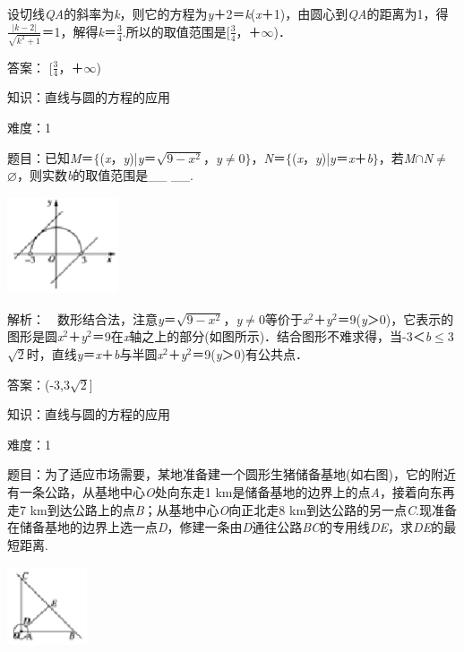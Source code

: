 \documentclass{article} %
\begin{document}
设切线\textit{QA}的斜率为\textit{k}，则它的方程为\textit{y}＋2＝\textit{k}(\textit{x}＋1)，由圆心到\textit{QA}的距离为1，得$\frac{|k-2|}{\sqrt{k^2+1}}$＝1，解得\textit{k}＝$\frac{3}{4}$.所以的取值范围是[$\frac{3}{4}$，＋$\mathrm{\infty}$)．

答案： [$\frac{3}{4}$，＋$\mathrm{\infty}$)

知识：直线与圆的方程的应用

难度：1

题目：已知\textit{M}＝$\mathrm{\{}$(\textit{x}，\textit{y})|\textit{y}＝$\sqrt{9-x^2}$，\textit{y}$\mathrm{\neq}$0$\mathrm{\}}$，\textit{N}＝$\mathrm{\{}$(\textit{x}，\textit{y})|\textit{y}＝\textit{x}＋\textit{b}$\mathrm{\}}$，若\textit{M}$\mathrm{\cap}$\textit{N}$\mathrm{\neq}$$\mathrm{\varnothing}$，则实数\textit{b}的取值范围是\_\_ \_\_.

\includegraphics*[width=1.29in, height=1.13in, keepaspectratio=false]{image301}

解析：　数形结合法，注意\textit{y}＝$\sqrt{9-x^2}$，\textit{y}$\mathrm{\neq}$0等价于\textit{x}${}^{2}$＋\textit{y}${}^{2}$＝9(\textit{y}＞0)，它表示的图形是圆\textit{x}${}^{2}$＋\textit{y}${}^{2}$＝9在\textit{x}轴之上的部分(如图所示)．结合图形不难求得，当-3＜\textit{b}$\mathrm{\le}$3$\sqrt{2}$时，直线\textit{y}＝\textit{x}＋\textit{b}与半圆\textit{x}${}^{2}$＋\textit{y}${}^{2}$＝9(\textit{y}＞0)有公共点．

答案：(-3,3$\sqrt{2}$]


知识：直线与圆的方程的应用

难度：1

题目：为了适应市场需要，某地准备建一个圆形生猪储备基地(如右图)，它的附近有一条公路，从基地中心\textit{O}处向东走1 km是储备基地的边界上的点\textit{A}，接着向东再走7 km到达公路上的点\textit{B}；从基地中心\textit{O}向正北走8 km到达公路的另一点\textit{C}.现准备在储备基地的边界上选一点\textit{D}，修建一条由\textit{D}通往公路\textit{BC}的专用线\textit{DE}，求\textit{DE}的最短距离.

\includegraphics*[width=0.93in, height=0.92in, keepaspectratio=false]{image302}
\end{document}
